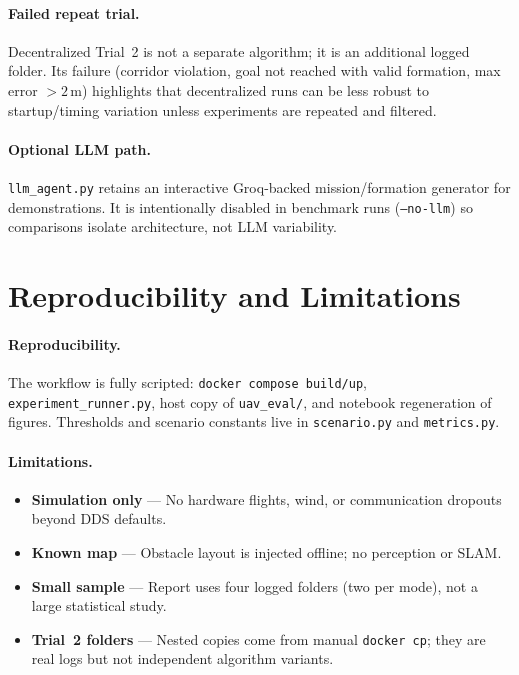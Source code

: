 \documentclass[a4paper,11pt]{article}
\begin{document}
\paragraph{Failed repeat trial.}
Decentralized Trial~2 is not a separate algorithm; it is an additional logged folder. Its failure (corridor violation, goal not reached with valid formation, max error $> 2\,\mathrm{m}$) highlights that decentralized runs can be less robust to startup/timing variation unless experiments are repeated and filtered.

\paragraph{Optional LLM path.}
\texttt{llm\_agent.py} retains an interactive Groq-backed mission/formation generator for demonstrations. It is intentionally disabled in benchmark runs (\texttt{--no-llm}) so comparisons isolate architecture, not LLM variability.

\section{Reproducibility and Limitations}

\paragraph{Reproducibility.}
The workflow is fully scripted: \texttt{docker compose build/up}, \texttt{experiment\_runner.py}, host copy of \texttt{uav\_eval/}, and notebook regeneration of figures. Thresholds and scenario constants live in \texttt{scenario.py} and \texttt{metrics.py}.

\paragraph{Limitations.}
\begin{itemize}
  \item \textbf{Simulation only} --- No hardware flights, wind, or communication dropouts beyond DDS defaults.
  \item \textbf{Known map} --- Obstacle layout is injected offline; no perception or SLAM.
  \item \textbf{Small sample} --- Report uses four logged folders (two per mode), not a large statistical study.
  \item \textbf{Trial~2 folders} --- Nested copies come from manual \texttt{docker cp}; they are real logs but not independent algorithm variants.
\end{itemize}
\end{document}
